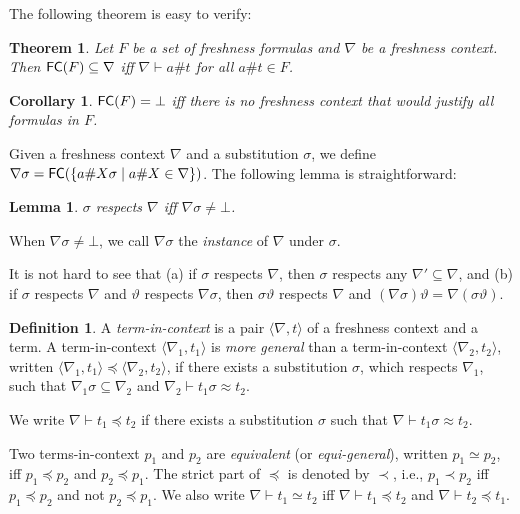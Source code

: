 \documentclass[11pt,a4paper]{amsart}
\newtheorem{theorem}{Theorem}
\newtheorem{lemma}{Lemma}
\newtheorem{corollary}{Corollary}
\theoremstyle{definition}
\newtheorem{definition}{Definition}
\newcommand{\np}[2]{\langle #1, \allowbreak #2\rangle}
\newcommand{\fe}{{\sf FC}}
\begin{document}
The following theorem is easy to verify:


\begin{theorem}
  \label{thm:properties:of:FC}
   Let $F$ be a set of freshness formulas and $\nabla$ be a freshness context. Then ${\fe}(F) \subseteq \nabla$ iff $\nabla\vdash a\# t$ for all ${ a\# t}\in F$.
\end{theorem}



\begin{corollary}
  \label{thm:properties:of:FC:2}
   ${\fe}(F)=\bot$ iff there is no freshness context that would justify all formulas in $F$.
\end{corollary}

Given a freshness context $\nabla$ and a substitution $\sigma$, we
define $\nabla\sigma = {\fe}(\allowbreak \{ a\# X\sigma \mid a\# X\in \nabla\})$. The following lemma is straightforward:

\begin{lemma}
  \label{lemma:fc:respects:context}
  $\sigma$ respects $\nabla$ iff $\nabla\sigma\neq \bot$.
\end{lemma}

When $\nabla\sigma\neq \bot$, we call $\nabla\sigma$ the
\emph{instance} of $\nabla$ under $\sigma$.

It is not hard to see that (a)  if $\sigma$ respects $\nabla$, then $\sigma$ respects any $\nabla'\subseteq \nabla$, and (b) if $\sigma$ respects $\nabla$ and $\vartheta$ respects $\nabla\sigma$, then $\sigma\vartheta$ respects $\nabla$ and $(\nabla\sigma)\vartheta=\nabla(\sigma\vartheta)$.

\begin{definition}
A \emph{term-in-context} is a pair $\np{\nabla}{t}$ of a freshness
context and a term. 
A term-in-context $\np{\nabla_1}{t_1}$ is \emph{more
  general} than a term-in-context $\np{\nabla_2}{t_2}$, written
$\np{\nabla_1}{t_1} \preceq \np{\nabla_2}{t_2}$, if there exists a
substitution $\sigma$, which respects $\nabla_1$, such that $
\nabla_1\sigma \subseteq \nabla_2$ and $ \nabla_2\vdash t_1\sigma
\approx t_2$. 

We write $\nabla \vdash t_1 \preceq t_2$ if there exists a substitution $\sigma$ such that $\nabla \vdash t_1\sigma \approx t_2$.

Two terms-in-context $p_1$ and $p_2$ are \emph{equivalent} (or
\emph{equi-general}), written $p_1\simeq p_2$, iff $p_1 \preceq p_2$
and $p_2 \preceq p_1$. The strict part of $\preceq$ is denoted by $\prec$, i.e.,
$p_1\prec p_2$ iff $p_1 \preceq p_2$ and not $p_2 \preceq p_1$.
We also write $\nabla \vdash t_1 \simeq t_2$ iff $\nabla \vdash t_1 \preceq t_2$ and $\nabla \vdash t_2 \preceq t_1$.
\end{definition}
\end{document}
